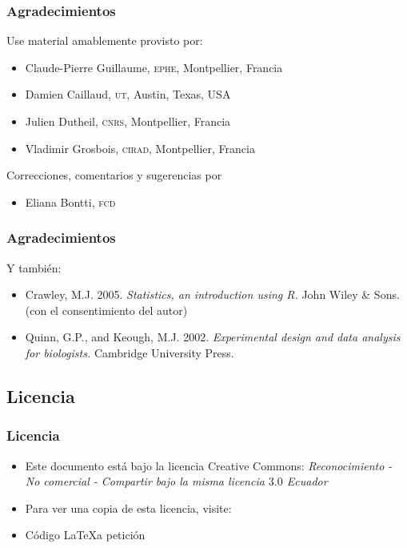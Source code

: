 \documentclass[mathserif]{beamer}
\begin{document}
\begin{frame}[label=tnx1]
\frametitle{Agradecimientos}
Use material amablemente provisto por:
  \begin{itemize}
    \item Claude-Pierre Guillaume, \textsc{ephe}, Montpellier, Francia
    \item Damien Caillaud, \textsc{ut}, Austin, Texas, USA
    \item Julien Dutheil, \textsc{cnrs}, Montpellier, Francia
    \item Vladimir Grosbois, \textsc{cirad}, Montpellier, Francia
  \end{itemize}
  \medskip
Correcciones, comentarios y sugerencias por
  \begin{itemize}
     \item Eliana Bontti, \textsc{fcd}
  \end{itemize}
\end{frame}%

 
\begin{frame}[label=tnx2]
   \frametitle{Agradecimientos}
   Y tambi\'en:
    \begin{itemize}
      \item Crawley, M.J. 2005. \emph{Statistics, an introduction using R.} John Wiley \& Sons. (con el consentimiento del autor)
      \item Quinn, G.P., and Keough, M.J. 2002. \emph{Experimental design and data analysis for biologists.} Cambridge University Press. 
   \end{itemize}
\end{frame}%


\subsection*{Licencia}

\begin{frame}[label=lic1]
\frametitle{Licencia \ccbyncsa}
\begin{itemize}
   \item Este documento est\'a bajo la licencia Creative Commons:\newline
           \emph{Reconocimiento - No comercial - Compartir bajo la misma licencia $3.0$ Ecuador}
   \item Para ver una copia de esta licencia, visite: 
   \item C\'odigo \LaTeX\hspace{1ex}a petici\'on 
\end{itemize}
\end{frame}%
\end{document}
